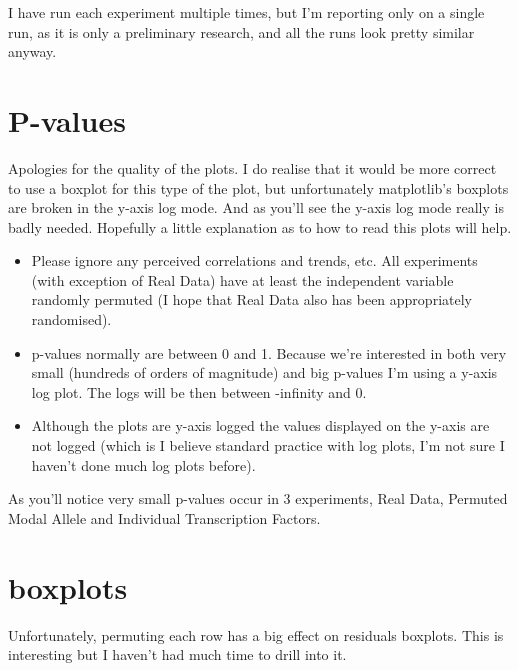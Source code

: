 I have run each experiment multiple times, but I'm reporting only on a single run, as it is only a preliminary research, and all the runs look pretty similar anyway.

\section{P-values}

Apologies for the quality of the plots. I do realise that it would be more correct to use a boxplot for this type of the plot, but unfortunately matplotlib's boxplots are broken in the y-axis log mode. And as you'll see the y-axis log mode really is badly needed. Hopefully a little explanation as to how to read this plots will help.
\begin{itemize}
  \item Please ignore any perceived correlations and trends, etc. All experiments (with exception of Real Data) have at least the independent variable randomly permuted (I hope that Real Data also has been appropriately randomised).
  \item p-values normally are between 0 and 1. Because we're interested in both very small (hundreds of orders of magnitude) and big p-values I'm using a y-axis log plot. The logs will be then between -infinity and 0.
  \item Although the plots are y-axis logged the values displayed on the y-axis are not logged (which is I believe standard practice with log plots, I'm not sure I haven't done much log plots before).
\end{itemize}

As you'll notice very small p-values occur in 3 experiments, Real Data, Permuted Modal Allele and Individual Transcription Factors.








\section{boxplots}

Unfortunately, permuting each row has a big effect on residuals boxplots. This is interesting but I haven't had much time to drill into it.



